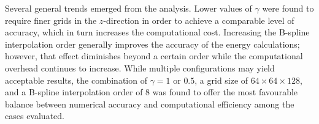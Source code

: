 






Several general trends emerged from the analysis. Lower values of $\gamma$ were found to require finer grids in the $ z$-direction in order to achieve a comparable level of accuracy, which in turn increases the computational cost. Increasing the B-spline interpolation order generally improves the accuracy of the energy calculations; however, that effect diminishes beyond a certain order while the computational overhead continues to increase. While multiple configurations may yield acceptable results, the combination of $\gamma = 1$ or $0.5$, a grid size of $64 \times 64 \times 128$, and a B-spline interpolation order of 8 was found to offer the most favourable balance between numerical accuracy and computational efficiency among the cases evaluated.

